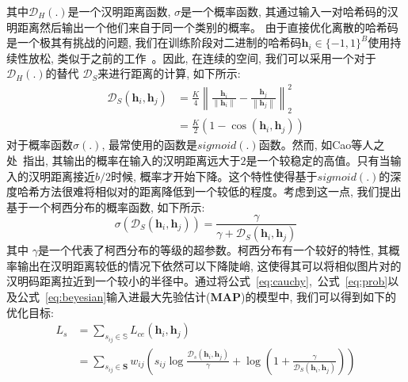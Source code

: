 其中$\mathcal{D}_H(.)$是一个汉明距离函数, $\sigma$是一个概率函数, 其通过输入一对哈希码的汉明距离然后输出一个他们来自于同一个类别的概率。 由于直接优化离散的哈希码是一个极其有挑战的问题, 我们在训练阶段对二进制的哈希码$\mathbf{h}_i \in \{-1,1\}^B$使用持续性放松, 类似于之前的工作~\cite{cao2017hashnet,cao2018deep,zhu2016deep}。因此, 在连续的空间, 我们可以采用一个对于$\mathcal{D}_H(.)$的替代 $\mathcal{D}_S$来进行距离的计算, 如下所示:
\begin{equation}
    \begin{aligned}
    \mathcal{D}_S\left(\boldsymbol{h}_{i}, \boldsymbol{h}_{j}\right) &=\frac{K}{4}\left\|\frac{\boldsymbol{h}_{i}}{\left\|\boldsymbol{h}_{i}\right\|}-\frac{\boldsymbol{h}_{j}}{\left\|\boldsymbol{h}_{j}\right\|}\right\|_{2}^{2} \\
    &=\frac{K}{2}\left(1-\cos \left(\boldsymbol{h}_{i}, \boldsymbol{h}_{j}\right)\right)
    \end{aligned}    
    \label{eq:prob}
\end{equation}
对于概率函数$\sigma(.)$, 最常使用的函数是$sigmoid(.)$函数。然而, 如Cao等人之处~\cite{cao2018deep}指出, 其输出的概率在输入的汉明距离远大于$2$是一个较稳定的高值。只有当输入的汉明距离接近$b/2$时候, 概率才开始下降。这个特性使得基于$sigmoid(.)$的深度哈希方法很难将相似对的距离降低到一个较低的程度。考虑到这一点, 我们提出基于一个柯西分布的概率函数, 如下所示:
\begin{equation}
    \sigma\left(\mathcal{D}_S\left(\boldsymbol{h}_{i}, \boldsymbol{h}_{j}\right)\right)=\frac{\gamma}{\gamma+\mathcal{D}_S\left(\boldsymbol{h}_{i}, \boldsymbol{h}_{j}\right)}
\label{eq:cauchy}
\end{equation}
其中 $\gamma$是一个代表了柯西分布的等级的超参数。柯西分布有一个较好的特性, 其概率输出在汉明距离较低的情况下依然可以下降陡峭, 这使得其可以将相似图片对的汉明码距离拉近到一个较小的半径中。通过将公式~\ref{eq:cauchy},~公式~\ref{eq:prob}以及公式~\ref{eq:beyesian}输入进最大先验估计(\textbf{MAP})的模型中, 我们可以得到如下的优化目标:
\begin{equation}
    \begin{aligned}
         L_{s} &= \sum_{s_{i j} \in \mathbb{S}} L_{ce}(\boldsymbol{h}_i,\boldsymbol{h}_j) \\
         &=\sum_{s_{i j} \in \mathbf{S}} w_{i j}\left(s_{i j} \log \frac{\mathcal{D}_s\left(\boldsymbol{h}_{i}, \boldsymbol{h}_{j}\right)}{\gamma}+\log \left(1+\frac{\gamma}{\mathcal{D}_S\left(\boldsymbol{h}_{i}, \boldsymbol{h}_{j}\right)}\right)\right)
    \end{aligned}
    \label{eq:final}
\end{equation}
